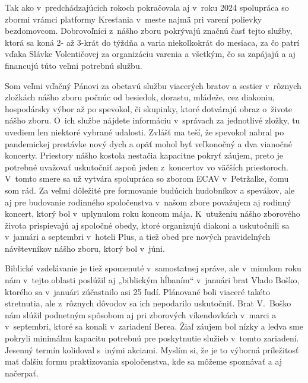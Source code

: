 Tak ako v~predchádzajúcich rokoch pokračovala aj v~roku 2024 spolupráca so zbormi vrámci platformy Kresťania v~meste najmä pri varení polievky bezdomovcom. Dobrovoľníci z~nášho zboru pokrývajú značnú časť tejto služby, ktorá sa koná 2- až 3-krát do týždňa a varia niekoľkokrát do mesiaca, za čo patrí vďaka Slávke Volentičovej za organizáciu varenia a všetkým, čo sa zapájajú a aj financujú túto veľmi potrebnú službu.


Som veľmi vďačný Pánovi za obetavú službu viacerých bratov a sestier v~rôznych zložkách nášho zboru počnúc od besiedok, dorastu, mládeže, cez diakoniu, hospodársky výbor až po spevokol, či skupinky, ktoré dotvárajú obraz o~živote nášho zboru. O~ich službe nájdete informáciu v~správach za jednotlivé zložky, tu uvediem len niektoré vybrané udalosti.
Zvlášť ma teší, že spevokol nabral po pandemickej prestávke nový dych a opäť mohol byť veľkonočný a dva vianočné koncerty. Priestory nášho kostola nestačia kapacitne pokryť záujem, preto je potrebné uvažovať uskutočniť aspoň jeden z~koncertov vo väčších priestoroch. V~tomto smere sa už vytvára spolupráca so zborom ECAV v~Petržalke, čomu som rád. Za veľmi dôležité pre formovanie budúcich hudobníkov a spevákov, ale aj pre budovanie rodinného spoločenstva v~našom zbore považujem aj rodinný koncert, ktorý bol v~uplynulom roku koncom mája.
K~utuženiu nášho zborového života prispievajú aj spoločné obedy, ktoré organizujú diakoni a uskutočnili sa v~januári a septembri v~hoteli Plus, a tiež obed pre nových pravidelných návštevníkov nášho zboru, ktorý bol v~júni.

Biblické vzdelávanie je tiež spomenuté v~samostatnej správe, ale v~minulom roku nám v~tejto oblasti poslúžil aj „biblickým hĺbaním“ v~januári brat Vlado Boško, ktorého sa v~januári zúčastnilo asi 25 ľudí. Plánované boli viaceré takéto stretnutia, ale z~rôznych dôvodov sa ich nepodarilo uskutočniť. Brat V.~Boško nám slúžil podnetným spôsobom aj pri zborových víkendovkách v~marci a v~septembri, ktoré sa konali v~zariadení Berea. Žiaľ záujem bol nízky a ledva sme pokryli minimálnu kapacitu potrebnú pre poskytnutie služieb v~tomto zariadení. Jesenný termín kolidoval s~inými akciami. Myslím si, že je to výborná príležitosť mať ďalšiu formu praktizovania spoločenstva, kde sa môžeme spoznávať a aj načerpať.

